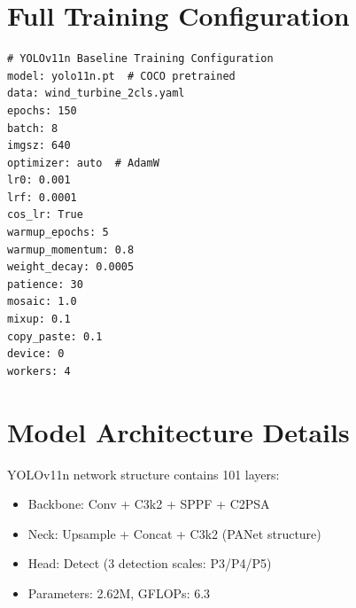 \documentclass[12pt,a4paper]{article}
\begin{document}
\newpage
\appendix
\section{Full Training Configuration}

\begin{verbatim}
# YOLOv11n Baseline Training Configuration
model: yolo11n.pt  # COCO pretrained
data: wind_turbine_2cls.yaml
epochs: 150
batch: 8
imgsz: 640
optimizer: auto  # AdamW
lr0: 0.001
lrf: 0.0001
cos_lr: True
warmup_epochs: 5
warmup_momentum: 0.8
weight_decay: 0.0005
patience: 30
mosaic: 1.0
mixup: 0.1
copy_paste: 0.1
device: 0
workers: 4
\end{verbatim}

\section{Model Architecture Details}

YOLOv11n network structure contains 101 layers:
\begin{itemize}[noitemsep]
  \item Backbone: Conv + C3k2 + SPPF + C2PSA
  \item Neck: Upsample + Concat + C3k2 (PANet structure)
  \item Head: Detect (3 detection scales: P3/P4/P5)
  \item Parameters: 2.62M, GFLOPs: 6.3
\end{itemize}
\end{document}
